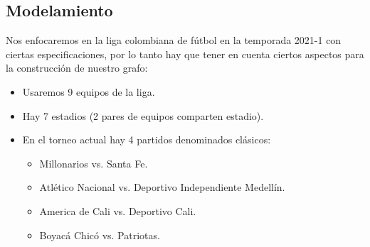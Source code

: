 \documentclass[11pt]{article}
\begin{document}
\begin{multicols}{2}
        \section{Modelamiento}
            Nos enfocaremos en la liga colombiana de fútbol en la temporada 2021-1 con ciertas especificaciones, por lo tanto hay que 
            tener en cuenta ciertos aspectos para la construcción de nuestro grafo:
            \begin{itemize}
                \item  Usaremos 9 equipos de la liga.
                \item  Hay 7 estadios (2 pares de equipos comparten estadio).
                \item  En el torneo actual hay 4 partidos denominados clásicos:
                \begin{itemize}
                    \item  Millonarios vs. Santa Fe.
                    \item  Atlético Nacional vs. Deportivo Independiente Medellín.
                    \item America de Cali vs. Deportivo Cali.
                    \item  Boyacá Chicó vs. Patriotas.
                \end{itemize}
            \end{itemize}


\end{multicols}
\end{document}
